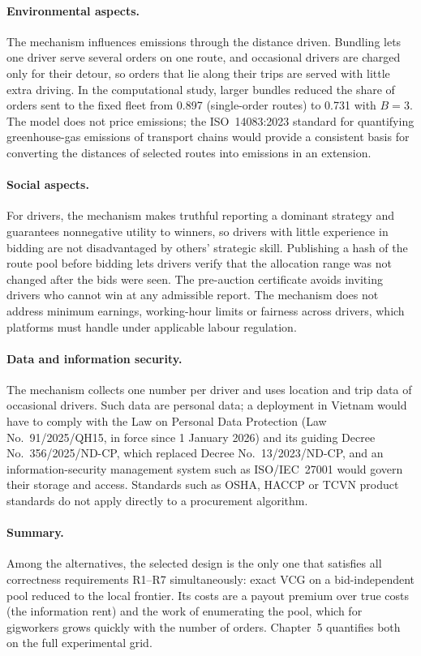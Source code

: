 \paragraph{Environmental aspects.} The mechanism influences emissions
through the distance driven. Bundling lets one driver serve several orders on
one route, and occasional drivers are charged only for their detour, so
orders that lie along their trips are served with little extra driving. In
the computational study, larger bundles reduced the share of orders sent to
the fixed fleet from 0.897 (single-order routes) to 0.731 with $B=3$. The
model does not price emissions; the ISO~14083:2023 standard for quantifying
greenhouse-gas emissions of transport chains would provide a consistent basis
for converting the distances of selected routes into emissions in an
extension.

\paragraph{Social aspects.} For drivers, the mechanism makes truthful
reporting a dominant strategy and guarantees nonnegative utility to
winners, so drivers with little experience in bidding are not disadvantaged
by others' strategic skill. Publishing a hash of the route pool before
bidding lets drivers verify that the allocation range was not changed after
the bids were seen. The pre-auction certificate avoids inviting drivers who
cannot win at any admissible report. The mechanism does not address
minimum earnings, working-hour limits or fairness across drivers, which
platforms must handle under applicable labour regulation.

\paragraph{Data and information security.} The mechanism collects one
number per driver and uses location and trip data of occasional drivers.
Such data are personal data; a deployment in Vietnam would have to comply
with the Law on Personal Data Protection (Law No.~91/2025/QH15, in force
since 1 January 2026) and its guiding Decree No.~356/2025/ND-CP, which
replaced Decree No.~13/2023/ND-CP, and an information-security management
system such as ISO/IEC~27001 would govern their storage and access.
Standards such as OSHA, HACCP or TCVN product standards do not apply directly
to a procurement algorithm.

\paragraph{Summary.} Among the alternatives, the selected design is the only
one that satisfies all correctness requirements R1--R7 simultaneously:
exact VCG on a bid-independent pool reduced to the local frontier. Its costs
are a payout premium over true costs (the information rent) and the work of
enumerating the pool, which for gigworkers grows quickly with the number of
orders. Chapter~5 quantifies both on
the full experimental grid.
